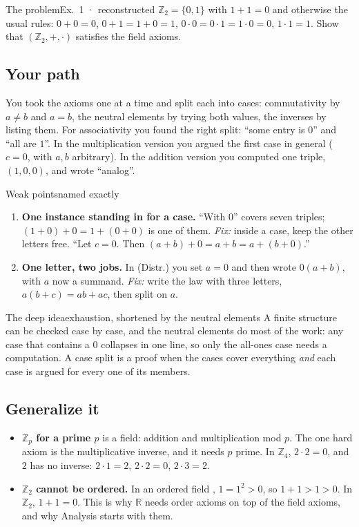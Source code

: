\documentclass{kaelearn}
\begin{document}
\begin{panel}[unbreakable]{The problem}{Ex.\ 1 · reconstructed}{}
$\mathbb{Z}_2=\{0,1\}$ with $1+1=0$ and otherwise the usual rules: $0+0=0$, $0+1=1+0=1$, $0\cdot0=0\cdot1=1\cdot0=0$,
$1\cdot1=1$. Show that $(\mathbb{Z}_2,+,\cdot)$ satisfies the field axioms.
\end{panel}

\subsection{Your path}
You took the axioms one at a time and split each into cases: commutativity by $a\neq b$ and $a=b$, the neutral
elements by trying both values, the inverses by listing them. For associativity you found the right split: ``some
entry is $0$'' and ``all are $1$''. In the multiplication version you argued the first case in general ($c=0$, with
$a,b$ arbitrary). In the addition version you computed one triple, $(1,0,0)$, and wrote ``analog''.

\begin{panel}[unbreakable]{Weak points}{named exactly}{}
\begin{enumerate}
  \item \textbf{One instance standing in for a case.} ``With $0$'' covers seven triples; $(1+0)+0=1+(0+0)$ is one of
        them. \emph{Fix:} inside a case, keep the other letters free. ``Let $c=0$. Then $(a+b)+0=a+b=a+(b+0)$.''
  \item \textbf{One letter, two jobs.} In (Distr.) you set $a=0$ and then wrote $0(a+b)$, with $a$ now a summand.
        \emph{Fix:} write the law with three letters, $a(b+c)=ab+ac$, then split on $a$.
\end{enumerate}
\end{panel}

\begin{panel}[unbreakable]{The deep idea}{exhaustion, shortened by the neutral elements}{}
A finite structure can be checked case by case, and the neutral elements do most of the work: any case that contains
a $0$ collapses in one line, so only the all-ones case needs a computation. A case split is a proof when the cases
cover everything \emph{and} each case is argued for every one of its members.
\end{panel}

\subsection{Generalize it}
\begin{itemize}
  \item \textbf{$\mathbb{Z}_p$ for a prime $p$} is a field: addition and multiplication mod $p$. The one hard axiom is
        the multiplicative inverse, and it needs $p$ prime. In $\mathbb{Z}_4$, $2\cdot2=0$, and $2$ has no inverse:
        $2\cdot1=2$, $2\cdot2=0$, $2\cdot3=2$.
  \item \textbf{$\mathbb{Z}_2$ cannot be ordered.} In an ordered field , $1=1^2>0$, so
        $1+1>1>0$. In $\mathbb{Z}_2$, $1+1=0$. This is why $\mathbb{R}$ needs order axioms on top of the field
        axioms, and why Analysis starts with them.
\end{itemize}
\end{document}
